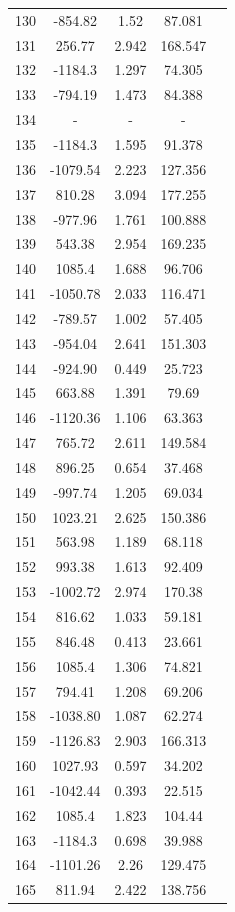 {\begin{longtable}{ccccc}
130 & -854.82 & 1.52 & 87.081 \\
131 & 256.77 & 2.942 & 168.547 \\
132 & -1184.3 & 1.297 & 74.305 \\
133 & -794.19 & 1.473 & 84.388 \\
134 & - & - & -  \\
135 & -1184.3 & 1.595 & 91.378 \\
136 & -1079.54 & 2.223 & 127.356 \\
137 & 810.28 & 3.094 & 177.255 \\
138 & -977.96 & 1.761 & 100.888 \\
139 & 543.38 & 2.954 & 169.235 \\
140 & 1085.4 & 1.688 & 96.706 \\
141 & -1050.78 & 2.033 & 116.471 \\
142 & -789.57 & 1.002 & 57.405 \\
143 & -954.04 & 2.641 & 151.303 \\
144 & -924.90 & 0.449 & 25.723 \\
145 & 663.88 & 1.391 & 79.69 \\
146 & -1120.36 & 1.106 & 63.363 \\
147 & 765.72 & 2.611 & 149.584 \\
148 & 896.25 & 0.654 & 37.468 \\
149 & -997.74 & 1.205 & 69.034 \\
150 & 1023.21 & 2.625 & 150.386 \\
151 & 563.98 & 1.189 & 68.118 \\
152 & 993.38 & 1.613 & 92.409 \\
153 & -1002.72 & 2.974 & 170.38 \\
154 & 816.62 & 1.033 & 59.181 \\
155 & 846.48 & 0.413 & 23.661 \\
156 & 1085.4 & 1.306 & 74.821 \\
157 & 794.41 & 1.208 & 69.206 \\
158 & -1038.80 & 1.087 & 62.274 \\
159 & -1126.83 & 2.903 & 166.313 \\
160 & 1027.93 & 0.597 & 34.202 \\
161 & -1042.44 & 0.393 & 22.515 \\
162 & 1085.4 & 1.823 & 104.44 \\
163 & -1184.3 & 0.698 & 39.988 \\
164 & -1101.26 & 2.26 & 129.475 \\
165 & 811.94 & 2.422 & 138.756 \\

\end{longtable}}

